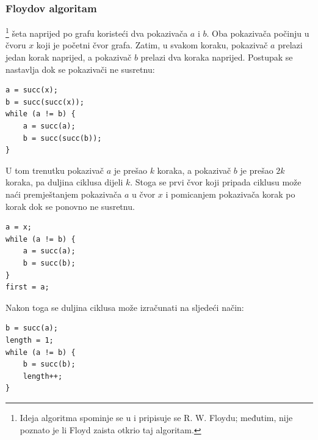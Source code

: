 \subsubsection{Floydov algoritam}


\footnote{Ideja algoritma spominje se u \cite{knu982}
i pripisuje se R. W. Floydu; međutim, nije poznato je li Floyd zaista
otkrio taj algoritam.} šeta naprijed
po grafu koristeći dva pokazivača $a$ i $b$.
Oba pokazivača počinju u čvoru $x$ koji
je početni čvor grafa.
Zatim, u svakom koraku, pokazivač $a$ prelazi
jedan korak naprijed, a pokazivač $b$
prelazi dva koraka naprijed.
Postupak se nastavlja dok se
pokazivači ne susretnu:
\begin{lstlisting}
a = succ(x);
b = succ(succ(x));
while (a != b) {
    a = succ(a);
    b = succ(succ(b));
}
\end{lstlisting}

U tom trenutku pokazivač $a$ je prešao $k$ koraka,
a pokazivač $b$ je prešao $2k$ koraka,
pa duljina ciklusa dijeli $k$.
Stoga se prvi čvor koji pripada ciklusu
može naći premještanjem pokazivača $a$ u čvor $x$
i pomicanjem pokazivača
korak po korak dok se ponovno ne susretnu.
\begin{lstlisting}
a = x;
while (a != b) {
    a = succ(a);
    b = succ(b);
}
first = a;
\end{lstlisting}

Nakon toga se duljina ciklusa
može izračunati na sljedeći način:
\begin{lstlisting}
b = succ(a);
length = 1;
while (a != b) {
    b = succ(b);
    length++;
}
\end{lstlisting}
